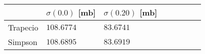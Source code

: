 \begin{tabular}{llllllll} \hline
\toprule 
 & $\sigma(0.0)$ [mb]  &  $\sigma(0.20)$ [mb]  \\ \midrule 
Trapecio & $\num{108.6774}$ & $\num{83.6741}$\\ 
Simpson & $\num{108.6895}$ & $\num{83.6919}$\\ 
 \bottomrule 
\end{tabular}
